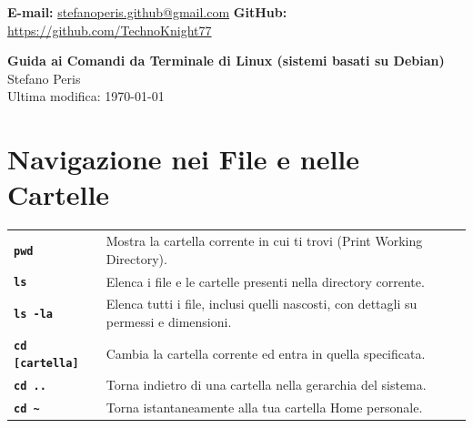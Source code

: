 \documentclass[10pt,a4paper]{article}
\begin{document}
\color{text}
\pagestyle{empty}

\noindent
\textbf{E-mail:} \href{mailto:stefanoperis.github@gmail.com}{stefanoperis.github@gmail.com} \hfill 
\textbf{GitHub:} \href{https://github.com/TechnoKnight77}{https://github.com/TechnoKnight77}

\vspace{15pt}

\begin{center}
    {\LARGE \bfseries \color{mintdark} Guida ai Comandi da Terminale di Linux (sistemi basati su Debian)} \\[0.4cm]
    {\large Stefano Peris} \\[0.2cm]
    {\small Ultima modifica: \today}
\end{center}

\vspace{15pt}

\section*{Navigazione nei File e nelle Cartelle}
\noindent
\begin{tabular}{@{}p{5cm}p{12cm}@{}}
\textbf{\texttt{pwd}} & Mostra la cartella corrente in cui ti trovi (Print Working Directory). \\
\textbf{\texttt{ls}} & Elenca i file e le cartelle presenti nella directory corrente. \\
\textbf{\texttt{ls -la}} & Elenca tutti i file, inclusi quelli nascosti, con dettagli su permessi e dimensioni. \\
\textbf{\texttt{cd [cartella]}} & Cambia la cartella corrente ed entra in quella specificata. \\
\textbf{\texttt{cd ..}} & Torna indietro di una cartella nella gerarchia del sistema. \\
\textbf{\texttt{cd \textasciitilde}} & Torna istantaneamente alla tua cartella Home personale.
\end{tabular}

\end{document}
